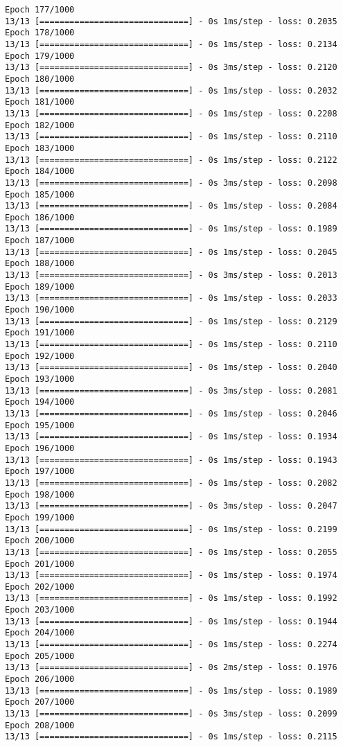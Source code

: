 \documentclass[11pt]{article}
\begin{document}
\begin{Verbatim}[commandchars=\\\{\}]
Epoch 177/1000
13/13 [==============================] - 0s 1ms/step - loss: 0.2035
Epoch 178/1000
13/13 [==============================] - 0s 1ms/step - loss: 0.2134
Epoch 179/1000
13/13 [==============================] - 0s 3ms/step - loss: 0.2120
Epoch 180/1000
13/13 [==============================] - 0s 1ms/step - loss: 0.2032
Epoch 181/1000
13/13 [==============================] - 0s 1ms/step - loss: 0.2208
Epoch 182/1000
13/13 [==============================] - 0s 1ms/step - loss: 0.2110
Epoch 183/1000
13/13 [==============================] - 0s 1ms/step - loss: 0.2122
Epoch 184/1000
13/13 [==============================] - 0s 3ms/step - loss: 0.2098
Epoch 185/1000
13/13 [==============================] - 0s 1ms/step - loss: 0.2084
Epoch 186/1000
13/13 [==============================] - 0s 1ms/step - loss: 0.1989
Epoch 187/1000
13/13 [==============================] - 0s 1ms/step - loss: 0.2045
Epoch 188/1000
13/13 [==============================] - 0s 3ms/step - loss: 0.2013
Epoch 189/1000
13/13 [==============================] - 0s 1ms/step - loss: 0.2033
Epoch 190/1000
13/13 [==============================] - 0s 1ms/step - loss: 0.2129
Epoch 191/1000
13/13 [==============================] - 0s 1ms/step - loss: 0.2110
Epoch 192/1000
13/13 [==============================] - 0s 1ms/step - loss: 0.2040
Epoch 193/1000
13/13 [==============================] - 0s 3ms/step - loss: 0.2081
Epoch 194/1000
13/13 [==============================] - 0s 1ms/step - loss: 0.2046
Epoch 195/1000
13/13 [==============================] - 0s 1ms/step - loss: 0.1934
Epoch 196/1000
13/13 [==============================] - 0s 1ms/step - loss: 0.1943
Epoch 197/1000
13/13 [==============================] - 0s 1ms/step - loss: 0.2082
Epoch 198/1000
13/13 [==============================] - 0s 3ms/step - loss: 0.2047
Epoch 199/1000
13/13 [==============================] - 0s 1ms/step - loss: 0.2199
Epoch 200/1000
13/13 [==============================] - 0s 1ms/step - loss: 0.2055
Epoch 201/1000
13/13 [==============================] - 0s 1ms/step - loss: 0.1974
Epoch 202/1000
13/13 [==============================] - 0s 1ms/step - loss: 0.1992
Epoch 203/1000
13/13 [==============================] - 0s 1ms/step - loss: 0.1944
Epoch 204/1000
13/13 [==============================] - 0s 1ms/step - loss: 0.2274
Epoch 205/1000
13/13 [==============================] - 0s 2ms/step - loss: 0.1976
Epoch 206/1000
13/13 [==============================] - 0s 1ms/step - loss: 0.1989
Epoch 207/1000
13/13 [==============================] - 0s 3ms/step - loss: 0.2099
Epoch 208/1000
13/13 [==============================] - 0s 1ms/step - loss: 0.2115

\end{Verbatim}
\end{document}
